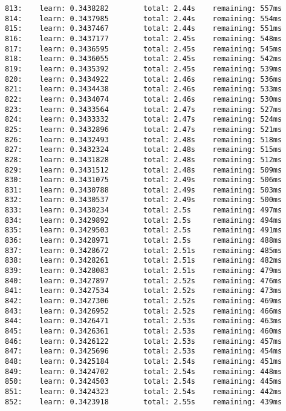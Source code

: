 \documentclass[11pt]{article}
\begin{document}
\begin{Verbatim}[commandchars=\\\{\}]
813:    learn: 0.3438282        total: 2.44s    remaining: 557ms
814:    learn: 0.3437985        total: 2.44s    remaining: 554ms
815:    learn: 0.3437467        total: 2.44s    remaining: 551ms
816:    learn: 0.3437177        total: 2.45s    remaining: 548ms
817:    learn: 0.3436595        total: 2.45s    remaining: 545ms
818:    learn: 0.3436055        total: 2.45s    remaining: 542ms
819:    learn: 0.3435392        total: 2.45s    remaining: 539ms
820:    learn: 0.3434922        total: 2.46s    remaining: 536ms
821:    learn: 0.3434438        total: 2.46s    remaining: 533ms
822:    learn: 0.3434074        total: 2.46s    remaining: 530ms
823:    learn: 0.3433564        total: 2.47s    remaining: 527ms
824:    learn: 0.3433332        total: 2.47s    remaining: 524ms
825:    learn: 0.3432896        total: 2.47s    remaining: 521ms
826:    learn: 0.3432493        total: 2.48s    remaining: 518ms
827:    learn: 0.3432324        total: 2.48s    remaining: 515ms
828:    learn: 0.3431828        total: 2.48s    remaining: 512ms
829:    learn: 0.3431512        total: 2.48s    remaining: 509ms
830:    learn: 0.3431075        total: 2.49s    remaining: 506ms
831:    learn: 0.3430788        total: 2.49s    remaining: 503ms
832:    learn: 0.3430537        total: 2.49s    remaining: 500ms
833:    learn: 0.3430234        total: 2.5s     remaining: 497ms
834:    learn: 0.3429892        total: 2.5s     remaining: 494ms
835:    learn: 0.3429503        total: 2.5s     remaining: 491ms
836:    learn: 0.3428971        total: 2.5s     remaining: 488ms
837:    learn: 0.3428672        total: 2.51s    remaining: 485ms
838:    learn: 0.3428261        total: 2.51s    remaining: 482ms
839:    learn: 0.3428083        total: 2.51s    remaining: 479ms
840:    learn: 0.3427897        total: 2.52s    remaining: 476ms
841:    learn: 0.3427534        total: 2.52s    remaining: 473ms
842:    learn: 0.3427306        total: 2.52s    remaining: 469ms
843:    learn: 0.3426952        total: 2.52s    remaining: 466ms
844:    learn: 0.3426471        total: 2.53s    remaining: 463ms
845:    learn: 0.3426361        total: 2.53s    remaining: 460ms
846:    learn: 0.3426122        total: 2.53s    remaining: 457ms
847:    learn: 0.3425696        total: 2.53s    remaining: 454ms
848:    learn: 0.3425184        total: 2.54s    remaining: 451ms
849:    learn: 0.3424702        total: 2.54s    remaining: 448ms
850:    learn: 0.3424503        total: 2.54s    remaining: 445ms
851:    learn: 0.3424323        total: 2.54s    remaining: 442ms
852:    learn: 0.3423918        total: 2.55s    remaining: 439ms

\end{Verbatim}
\end{document}
